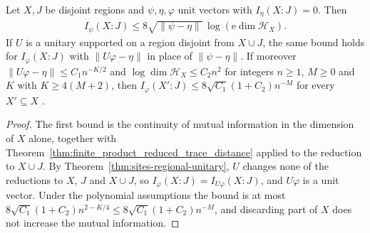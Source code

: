 \begin{theorem}
    \label{thm:finite_product_information_perturbation}
    \leanok
    Let $X,J$ be disjoint regions and $\psi,\eta,\varphi$ unit vectors with
    $I_\eta(X:J)=0$. Then
    \begin{align}
        I_\psi(X:J)\le8\sqrt{\lVert\psi-\eta\rVert}\,\log(\mathrm e\dim\mathcal H_X).
    \end{align}
    If $U$ is a unitary supported on a region disjoint from $X\cup J$, the same
    bound holds for $I_\varphi(X:J)$ with $\lVert U\varphi-\eta\rVert$ in place of
    $\lVert\psi-\eta\rVert$. If moreover
    $\lVert U\varphi-\eta\rVert\le C_1n^{-K/2}$ and
    $\log\dim\mathcal H_X\le C_2n^2$ for integers $n\ge1$, $M\ge0$ and $K$ with
    $K\ge4(M+2)$, then
    $I_\varphi(X':J)\le8\sqrt{C_1}(1+C_2)n^{-M}$ for every $X'\subseteq X$
    \cite[Proposition~10.2]{OpenAI2026AreaLaw}.
\end{theorem}
\begin{proof}\leanok
    The first bound is the continuity of mutual information in the dimension of
    $X$ alone, together with
    Theorem~\ref{thm:finite_product_reduced_trace_distance} applied to the
    reduction to $X\cup J$. By Theorem~\ref{thm:sites-regional-unitary}, $U$ changes
    none of the reductions to $X$, $J$ and $X\cup J$, so
    $I_\varphi(X:J)=I_{U\varphi}(X:J)$, and $U\varphi$ is a unit vector. Under the
    polynomial assumptions the bound is at most
    $8\sqrt{C_1}(1+C_2)n^{2-K/4}\le8\sqrt{C_1}(1+C_2)n^{-M}$, and discarding part
    of $X$ does not increase the mutual information.
\end{proof}

